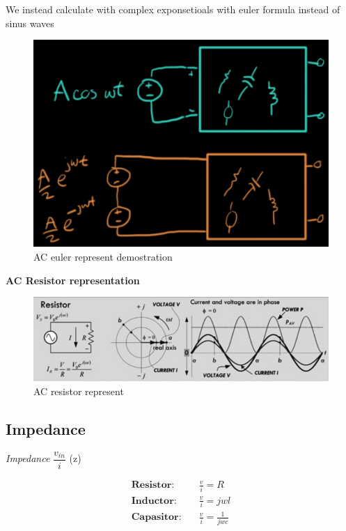 \documentclass{article}
\begin{document}
We instead calculate with complex exponsetioals with euler formula instead of sinus waves
\begin{figure}[h]
    \centering
    \includegraphics[width=13cm]{image/AC-euler-representation-demostration.png}
    \caption{AC euler represent demostration}
\end{figure}

\vspace{10mm}
\textbf{AC Resistor representation}
\begin{figure}[h]
    \centering
    \includegraphics[width=13cm]{image/AC_resistor_representation.png}
    \caption{AC resistor represent}
\end{figure}


\newpage
\subsection{Impedance}
\textit{Impedance} $\dfrac{v_{in}}{i}$ (z)

\begin{align*}
  \textbf{Resistor}: &\quad \frac{v}{i}=R \\
  \textbf{Inductor}: &\quad \frac{v}{i}=jwl \\
  \textbf{Capasitor}: &\quad \frac{v}{i}=\frac{1}{jwc}\\
\end{align*}
\end{document}
